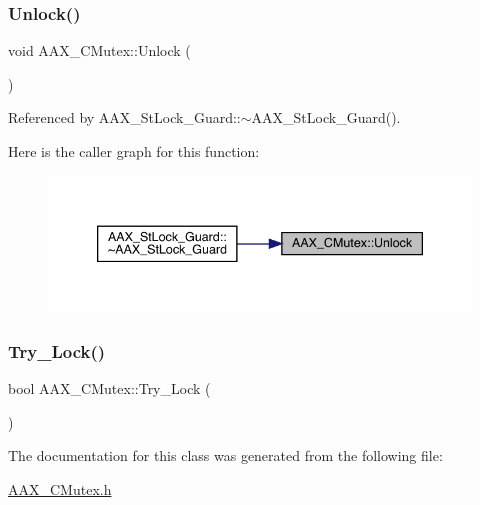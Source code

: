 \subsubsection{\texorpdfstring{Unlock()}{Unlock()}}
{\footnotesize\ttfamily void A\+A\+X\+\_\+\+C\+Mutex\+::\+Unlock (\begin{DoxyParamCaption}{ }\end{DoxyParamCaption})}



Referenced by A\+A\+X\+\_\+\+St\+Lock\+\_\+\+Guard\+::$\sim$\+A\+A\+X\+\_\+\+St\+Lock\+\_\+\+Guard().

Here is the caller graph for this function\+:
\nopagebreak
\begin{figure}[H]
\begin{center}
\leavevmode
\includegraphics[width=339pt]{a01501_a8c25bbd0e6030325a7965f8453d96323_icgraph}
\end{center}
\end{figure}
\mbox{\label{a01501_afdc4af88dd8aca7acba0907f1cb5846f}} 
\subsubsection{\texorpdfstring{Try\_Lock()}{Try\_Lock()}}
{\footnotesize\ttfamily bool A\+A\+X\+\_\+\+C\+Mutex\+::\+Try\+\_\+\+Lock (\begin{DoxyParamCaption}{ }\end{DoxyParamCaption})}



The documentation for this class was generated from the following file\+:\begin{DoxyCompactItemize}
\item 
\mbox{\hyperlink{a00443}{A\+A\+X\+\_\+\+C\+Mutex.\+h}}\end{DoxyCompactItemize}
